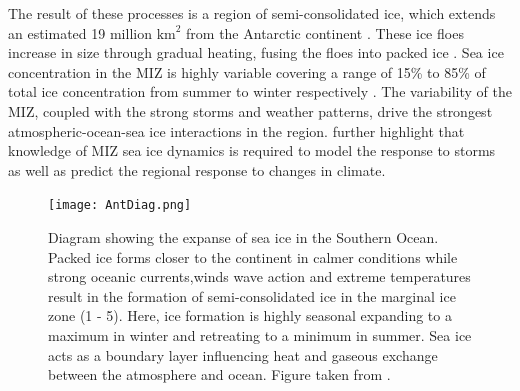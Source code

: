 The result of these processes is a region of semi-consolidated ice, which extends an estimated 19 million $\text{km}^2$ from the Antarctic continent \cite{MAKSYM2012seaiceextent}. These ice floes increase in size through gradual heating, fusing the floes into packed ice \cite{arrigo2004large}. Sea ice concentration in the MIZ is highly variable covering a range of 15\% to 85\% of total ice concentration from summer to winter respectively \cite{alberello2019drift}. The variability of the MIZ, coupled with the strong storms and weather patterns, drive the strongest atmospheric-ocean-sea ice interactions in the region. \textcite{alberello2019drift} further highlight that knowledge of MIZ sea ice dynamics is required to model the response to storms as well as predict the regional response to changes in climate.

\begin{figure}[H]
	\centering
	\texttt{[image: AntDiag.png]}
	\caption{Diagram showing the expanse of sea ice in the Southern Ocean. Packed ice forms closer to the continent in calmer conditions while strong oceanic currents,winds wave action and extreme temperatures result in the formation of semi-consolidated ice in the marginal ice zone (1 - 5). Here, ice formation is highly seasonal expanding to a maximum in winter and retreating to a minimum in summer. Sea ice acts as a boundary layer influencing heat and gaseous  exchange between the atmosphere and ocean. Figure taken from \textcite{Antseaice}.}
	\label{fig:AntaDiag}
\end{figure}

